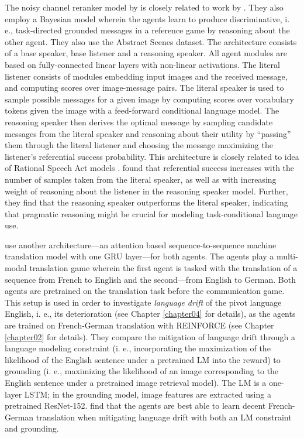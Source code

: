 The noisy channel reranker model by \cite{lazaridou2020multi} is closely related to work by \cite{andreas2016reasoning}. They also employ a Bayesian model wherein the agents learn to produce discriminative, i. e., task-directed grounded messages in a reference game by reasoning about the other agent. They also use the Abstract Scenes dataset. The architecture consists of a base speaker, base listener and a reasoning speaker. All agent modules are based on fully-connected linear layers with non-linear activations. The literal listener consists of modules embedding input images and the received message, and computing scores over image-message pairs. The literal speaker is used to sample possible messages for a given image by computing scores over vocabulary tokens given the image with a feed-forward conditional language model. The reasoning speaker then derives the optimal message by sampling candidate messages from the literal speaker and reasoning about their utility by ``passing'' them through the literal listener and choosing the message maximizing the listener's referential success probability. This architecture is closely related to idea of Rational Speech Act models \parencite{goodman2016pragmatic}. 
\cite{andreas2016reasoning} found that referential success increases with the number of samples taken from the literal speaker, as well as with increasing weight of reasoning about the listener in the reasoning speaker model. Further, they find that the reasoning speaker outperforms the literal speaker, indicating that pragmatic reasoning might be crucial for modeling task-conditional language use. 

\cite{lee2019countering} use another architecture---an attention based sequence-to-sequence machine translation model with one GRU layer---for both agents. 
The agents play a multi-modal translation game wherein the first agent is tasked with the translation of a sequence from French to English and the second---from English to German. Both agents are pretrained on the translation task before the communication game. This setup is used in order to investigate \textit{language drift} of the pivot language English, i. e., its deterioration (see Chapter \ref{chapter04} for details), as the agents are trained on French-German translation with REINFORCE (see Chapter \ref{chapter02} for details). They compare the mitigation of language drift through a language modeling constraint (i. e., incorporating the maximization of the likelihood of the English sentence under a pretrained LM into the reward) to grounding (i. e., maximizing the likelihood of an image corresponding to the English sentence under a pretrained image retrieval model). The LM is a one-layer LSTM; in the grounding model, image features are extracted using a pretrained ResNet-152. \cite{lee2019countering} find that the agents are best able to learn decent French-German translation when mitigating language drift with both an LM constraint and grounding. 


